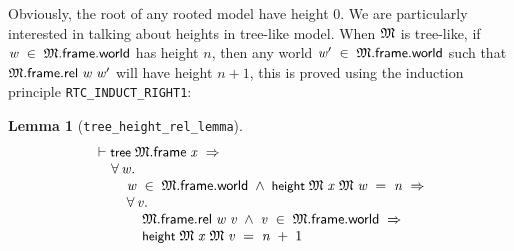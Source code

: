 \documentclass[letterpaper]{article}
\newtheorem{lm}{Lemma}
\renewcommand{\HOLConst}[1]{{\textsf{\upshape\small #1}}}
\renewcommand{\HOLinline}[1]{\ensuremath{#1}}
\newenvironment{holmath}{\begin{displaymath}\begin{array}{l}}{\end{array}\end{displaymath}\ignorespacesafterend}
\begin{document}
Obviously, the root of any rooted model have height $0$. We are particularly interested in talking about heights in tree-like model. When \HOLinline{\HOLFreeVar{\ensuremath{\mathfrak{M}}}} is tree-like, if \HOLinline{\HOLFreeVar{w}\;\HOLSymConst{\HOLTokenIn{}}\;\HOLFreeVar{\ensuremath{\mathfrak{M}}}.\HOLFieldName{frame}.\HOLFieldName{world}} has height $n$, then any world \HOLinline{\HOLFreeVar{w\sp{\prime}}\;\HOLSymConst{\HOLTokenIn{}}\;\HOLFreeVar{\ensuremath{\mathfrak{M}}}.\HOLFieldName{frame}.\HOLFieldName{world}} such that \HOLinline{\HOLFreeVar{\ensuremath{\mathfrak{M}}}.\HOLFieldName{frame}.\HOLFieldName{rel}\;\HOLFreeVar{w}\;\HOLFreeVar{w\sp{\prime}}} will have height $n+1$, this is proved using the induction principle \texttt{RTC_INDUCT_RIGHT1}:
\begin{lm}[\texttt{tree_height_rel_lemma}]
\begin{holmath}
  \ensuremath{\HOLTokenTurnstile}\HOLConst{tree}\;\HOLFreeVar{\ensuremath{\mathfrak{M}}}.\HOLFieldName{frame}\;\HOLFreeVar{x}\;\HOLSymConst{\HOLTokenImp{}}\\
\;\;\;\;\;\HOLSymConst{\HOLTokenForall{}}\HOLBoundVar{w}.\\
\;\;\;\;\;\;\;\;\;\HOLBoundVar{w}\;\HOLSymConst{\HOLTokenIn{}}\;\HOLFreeVar{\ensuremath{\mathfrak{M}}}.\HOLFieldName{frame}.\HOLFieldName{world}\;\HOLSymConst{\HOLTokenConj{}}\;\HOLConst{height}\;\HOLFreeVar{\ensuremath{\mathfrak{M}}}\;\HOLFreeVar{x}\;\HOLFreeVar{\ensuremath{\mathfrak{M}}}\;\HOLBoundVar{w}\;\HOLSymConst{=}\;\HOLFreeVar{n}\;\HOLSymConst{\HOLTokenImp{}}\\
\;\;\;\;\;\;\;\;\;\HOLSymConst{\HOLTokenForall{}}\HOLBoundVar{v}.\\
\;\;\;\;\;\;\;\;\;\;\;\;\;\HOLFreeVar{\ensuremath{\mathfrak{M}}}.\HOLFieldName{frame}.\HOLFieldName{rel}\;\HOLBoundVar{w}\;\HOLBoundVar{v}\;\HOLSymConst{\HOLTokenConj{}}\;\HOLBoundVar{v}\;\HOLSymConst{\HOLTokenIn{}}\;\HOLFreeVar{\ensuremath{\mathfrak{M}}}.\HOLFieldName{frame}.\HOLFieldName{world}\;\HOLSymConst{\HOLTokenImp{}}\\
\;\;\;\;\;\;\;\;\;\;\;\;\;\HOLConst{height}\;\HOLFreeVar{\ensuremath{\mathfrak{M}}}\;\HOLFreeVar{x}\;\HOLFreeVar{\ensuremath{\mathfrak{M}}}\;\HOLBoundVar{v}\;\HOLSymConst{=}\;\HOLFreeVar{n}\;\HOLSymConst{\ensuremath{+}}\;\HOLNumLit{1}
\end{holmath}
\end{lm}
\end{document}
